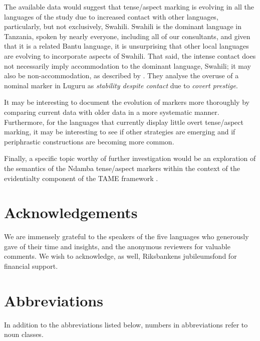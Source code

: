 \documentclass[output=paper,
            colorlinks, citecolor=brown
            ,draftmode
		  ]{langscibook}
\begin{document}
The available data would suggest that tense/aspect marking is evolving in all the languages of the study due to increased contact with other languages, particularly, but not exclusively, Swahili. Swahili is the dominant language in Tanzania, spoken by nearly everyone, including all of our consultants, and given that it is a related Bantu language, it is unsurprising that other local languages are evolving to incorporate aspects of Swahili. That said, the intense contact does not necessarily imply accommodation to the dominant language, Swahili; it may also be non-accommodation, as described by \citet{PetzellKühl2017}. They analyse the overuse of a nominal marker in Luguru as \textit{stability despite contact} due to \textit{covert prestige}.



It may be interesting to document the evolution of markers more thoroughly by comparing current data with older data in a more systematic manner. Furthermore, for the languages that currently display little overt tense/aspect marking, it may be interesting to see if other strategies are emerging and if periphrastic constructions are becoming more common.



Finally, a specific topic worthy of further investigation would be an exploration of the semantics of the Ndamba tense/aspect markers within the context of the evidentialty component of the TAME framework \citep{Dahl2013}.

\section*{Acknowledgements}

We are immensely grateful to the speakers of the five languages who generously gave of their time and insights, and the anonymous reviewers for valuable comments.  We wish to acknowledge, as well, Riksbankens jubileumsfond for financial support.

\newpage
\section*{Abbreviations}

In addition to the abbreviations listed below, numbers in abbreviations refer to noun classes.
\end{document}
